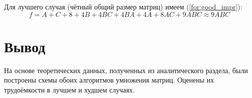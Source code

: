 Для лучшего случая (чётный общий размер матриц) имеем (\ref{for:good_impr}):
\begin{equation}
    \label{for:good_impr}
    f = A + C + 8 + 4B +4BC + 4BA + 4A + 8AC + 9ABC \approx 9ABC
\end{equation}

\section{Вывод}
На основе теоретических данных, полученных из аналитического раздела, были построены схемы обоих алгоритмов умножения матриц.  Оценены их трудоёмкости в лучшем и худшем случаях.
